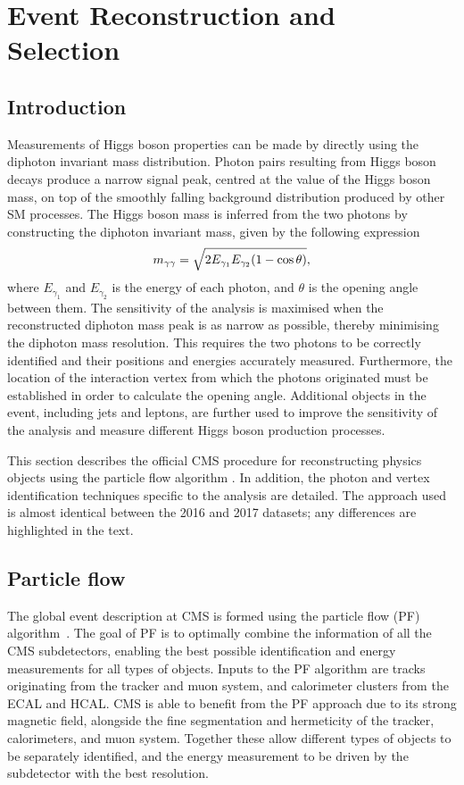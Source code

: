 \chapter{Event Reconstruction and Selection}
\label{chap:objects}

\section{Introduction}

Measurements of Higgs boson properties can be made 
by directly using the diphoton invariant mass distribution.
Photon pairs resulting from Higgs boson decays produce a narrow signal peak, 
centred at the value of the Higgs boson mass, 
on top of the smoothly falling background distribution produced by other SM processes.
The Higgs boson mass is inferred from the two photons by constructing the diphoton invariant mass, 
given by the following expression
\begin{equation}
\label{eq:obj_mgg}
m_{\gamma\gamma} = \sqrt{ 2 E_{\gamma_1} E_{\gamma_2} (1 - \cos{\theta}) } ,
\end{equation}
where $E_{\gamma_1}$ and $E_{\gamma_2}$ is the energy of each photon, 
and $\theta$ is the opening angle between them.
The sensitivity of the analysis is maximised 
when the reconstructed diphoton mass peak is as narrow as possible, 
thereby minimising the diphoton mass resolution.
This requires the two photons to be correctly identified 
and their positions and energies accurately measured.
Furthermore, the location of the interaction vertex from which the photons originated 
must be established in order to calculate the opening angle.
Additional objects in the event, including jets and leptons, 
are further used to improve the sensitivity of the analysis 
and measure different Higgs boson production processes.

This section describes the official CMS procedure for reconstructing physics objects using the particle flow algorithm \cite{ParticleFlow}.
In addition, the photon and vertex identification techniques specific to the \Hgg analysis are detailed.
The approach used is almost identical between the 2016 and 2017 datasets; 
any differences are highlighted in the text.

\section{Particle flow}
The global event description at CMS is formed using the particle flow (PF) algorithm~\cite{ParticleFlow}.
The goal of PF is to optimally combine the information of all the CMS subdetectors, 
enabling the best possible identification and energy measurements for all types of objects.
Inputs to the PF algorithm are tracks originating from the tracker and muon system, 
and calorimeter clusters from the ECAL and HCAL.
CMS is able to benefit from the PF approach due to its strong magnetic field, 
alongside the fine segmentation and hermeticity of the tracker, calorimeters, and muon system.
Together these allow different types of objects to be separately identified, 
and the energy measurement to be driven by the subdetector with the best resolution.

